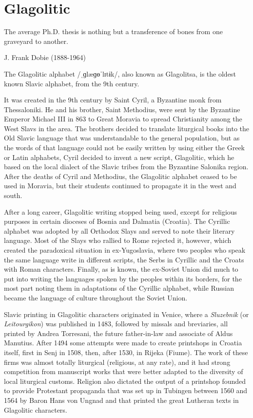\newfontfamily{}

\section{Glagolitic}

\epigraph{The average Ph.D. thesis is nothing but a transference of bones from one graveyard to another.}{%
J. Frank Dobie (1888-1964)}


\label{s:glagolitic}

\noindent
The Glagolitic alphabet /{\glagolitic ˌɡlæɡɵˈlɪtɨk/}, also known as Glagolitsa, is the oldest known Slavic alphabet, from the 9th century.

It was created in the 9th century by Saint Cyril, a Byzantine monk from Thessaloniki. He and his brother, Saint Methodius, were sent by the Byzantine Emperor Michael III in 863 to Great Moravia to spread Christianity among the West Slavs in the area. The brothers decided to translate liturgical books into the Old Slavic language that was understandable to the general population, but as the words of that language could not be easily written by using either the Greek or Latin alphabets, Cyril decided to invent a new script, Glagolitic, which he based on the local dialect of the Slavic tribes from the Byzantine Salonika region.
After the deaths of Cyril and Methodius, the Glagolitic alphabet ceased to be used in Moravia, but their students continued to propagate it in the west and south. 

After a long career, Glagolitic writing stopped being used, except for
religious purposes in certain dioceses of Bosnia and Dalmatia (Croatia).
The Cyrillic alphabet was adopted by all Orthodox Slays and served to note
their literary language. Most of the Slays who rallied to Rome rejected it,
however, which created the paradoxical situation in ex-Yugoslavia, where
two peoples who speak the same language write in different scripts, the
Serbs in Cyrillic and the Croats with Roman characters. Finally, as is
known, the ex-Soviet Union did much to put into writing the languages
spoken by the peoples within its borders, for the most part noting them in
adaptations of the Cyrillic alphabet, while Russian became the language of
culture throughout the Soviet Union.\cite{henri1994}

Slavic printing in Glagolitic characters originated in Venice, where a
\textit{Sluzebnik} (or \textit{Leitourgikon}) was published in 1483, followed by missals and
breviaries, all printed by Andrea Torresani, the future father-in-law and
associate of Aldus Manutius. After 1494 some attempts were made to create
printshops in Croatia itself, first in Senj in 1508, then, after 1530, in
Rijeka (Fiume). The work of these firms was almost totally liturgical (religious,
at any rate), and it had strong competition from manuscript works
that were better adapted to the diversity of local liturgical customs. Religion
also dictated the output of a printshop founded to provide Protestant propaganda
that was set up in Tubingen between 1560 and 1564 by Baron
Hans von Ungnad and that printed the great Lutheran texts in Glagolitic
characters.


